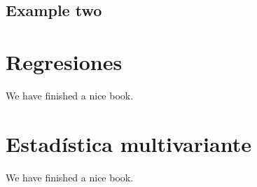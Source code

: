\documentclass[
]{book}
\begin{document}
\hypertarget{example-two}{%
\section{Example two}\label{example-two}}

\hypertarget{regresiones}{%
\chapter{Regresiones}\label{regresiones}}

We have finished a nice book.

\hypertarget{estaduxedstica-multivariante}{%
\chapter{Estadística multivariante}\label{estaduxedstica-multivariante}}

We have finished a nice book.

  
\end{document}
